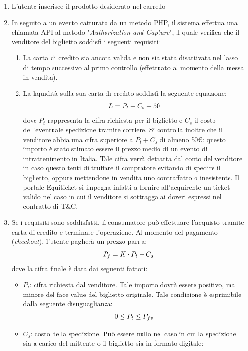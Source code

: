 \begin{enumerate}
\item L'utente inserisce il prodotto desiderato nel carrello
\item In seguito a un evento catturato da un metodo PHP, il sistema effettua una chiamata API al metodo "\textit{Authorization and Capture}", il quale verifica che il venditore del biglietto soddisfi i seguenti requisiti: 
\begin{enumerate}
\item La carta di credito sia ancora valida e non sia stata disattivata nel lasso di tempo successivo al primo controllo (effettuato al momento della messa in vendita).
\item La liquidità sulla sua carta di credito soddisfi la seguente equazione: 
\begin{align*}
\textbf{$ L = P_{t} + C_{s} + 50 $}
\end{align*}
dove $P_{t}$ rappresenta la cifra richiesta per il biglietto e $C_{s}$ il costo dell'eventuale spedizione tramite corriere. Si controlla inoltre che il venditore abbia una cifra superiore a $P_{t} + C_{s}$ di almeno 50€: questo importo è stato stimato essere il prezzo medio di un evento di intrattenimento in Italia. Tale cifra verrà detratta dal conto del venditore in caso questo tenti di truffare il compratore evitando di spedire il biglietto, oppure mettendone in vendita uno contraffatto o inesistente. Il portale Equiticket si impegna infatti a fornire all'acquirente un ticket valido nel caso in cui il venditore si sottragga ai doveri espressi nel contratto di T\&C.
\end{enumerate}
\item Se i requisiti sono soddisfatti, il consumatore può effettuare l'acquisto tramite carta di credito e terminare l'operazione. Al momento del pagamento (\textit{checkout}), l'utente pagherà un prezzo pari a: 
\begin{align*}
\textbf{$ P_{f} = K \cdot
{P_{t}} + C_{s} $}
\end{align*}
dove la cifra finale è data dai seguenti fattori: 
\begin{itemize}
\item $P_{t}$: cifra richiesta dal venditore. Tale importo dovrà essere positivo, ma minore del face value del biglietto originale. Tale condizione è esprimibile dalla seguente disuguaglianza: 
\begin{align*}
\textbf{$ 0 \leq{ P_{t}} \leq{ P_{fv}} $}
\end{align*}
\item $C_{s}$: costo della spedizione. Può essere nullo nel caso in cui la spedizione sia a carico del mittente o il biglietto sia in formato digitale: 

\end{itemize}
\end{enumerate}
